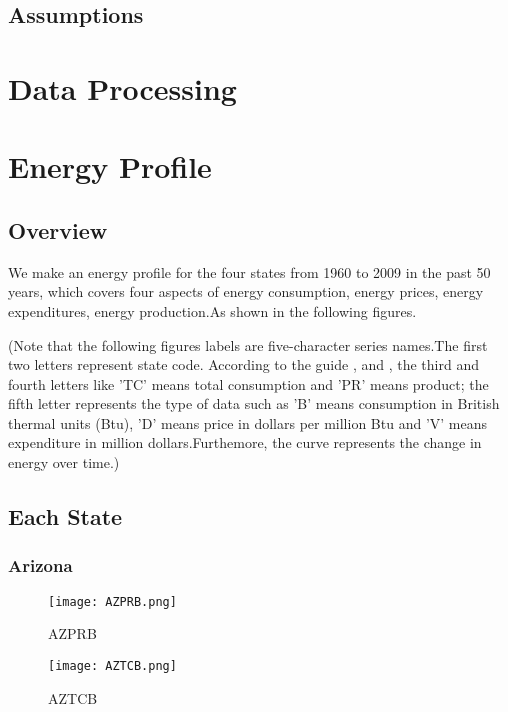 \documentclass{mcmthesis}
\begin{document}
\subsection{Assumptions}

\section{Data Processing}

\section{Energy Profile}
\subsection{Overview}
We make an energy profile for the four states from 1960 to 2009 in the past 50 years, which covers four aspects of energy consumption, energy prices, energy expenditures, energy production.As shown in the following figures.

(Note that the following figures labels are five-character series names.The first two letters  represent state code. According to the guide \cite{pr_guide},\cite{use_guide} and \cite{product}, the third and fourth letters like 'TC' means total consumption and 'PR' means product; the fifth letter represents the type of data such as 'B' means consumption in British thermal units (Btu), 'D' means price in dollars per million Btu and 'V' means expenditure in million dollars.Furthemore, the curve represents the change in energy over time.) 

\subsection{Each State}
\subsubsection{Arizona}
\begin{figure}[H]
\begin{minipage}[htb]{0.5\textwidth}
\centering
\texttt{[image: AZPRB.png]}
\caption{AZPRB} \label{fig:AZPRB}
\end{minipage}
\begin{minipage}[htb]{0.5\textwidth}
\centering
\texttt{[image: AZTCB.png]}
\caption{AZTCB} \label{fig:AZTCB}
\end{minipage}
\end{figure}
\end{document}
